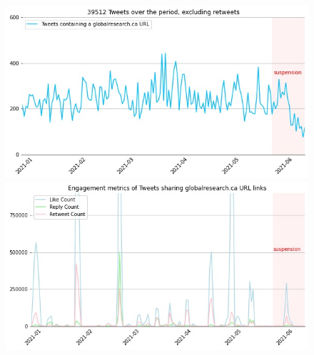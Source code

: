 \documentclass[11pt,a4paper]{article}
\begin{document}
\begin{figure}
\centering
\begin{multicols}{1}

    \includegraphics[scale=0.33]{./img/globalresearch/sum_globalresearch.ca_6_months.jpg}\par 
    \includegraphics[scale=0.33]{./img/globalresearch/engagement_sum_rolling_1_globalresearch.ca.jpg}\par 
    \end{multicols}
\begin{multicols}{1}


\end{multicols}
\end{figure}
\end{document}
